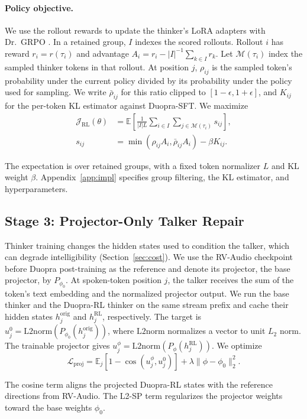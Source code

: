 \paragraph{Policy objective.}
We use the rollout rewards to update the thinker's LoRA adapters \citep{hu2022lora} with Dr.~GRPO \citep{liu2025drgrpo}. In a retained group, $I$ indexes the scored rollouts. Rollout $i$ has reward $r_i=r(\tau_i)$ and advantage $A_i=r_i-|I|^{-1}\sum_{k\in I}r_k$. Let $\mathcal{M}(\tau_i)$ index the sampled thinker tokens in that rollout. At position $j$, $\rho_{ij}$ is the sampled token's probability under the current policy divided by its probability under the policy used for sampling. We write $\bar\rho_{ij}$ for this ratio clipped to $[1-\epsilon,1+\epsilon]$, and $K_{ij}$ for the per-token KL estimator against Duopra-SFT. We maximize
\begin{equation}
\label{eq:grpo}
\begin{split}
\mathcal J_{\mathrm{RL}}(\theta) &= \mathbb E\!\left[
 \frac{1}{|I|L}\sum_{i\in I}\sum_{j\in\mathcal{M}(\tau_i)} s_{ij}\right],\\
 s_{ij}&=\min(\rho_{ij}A_i,\bar\rho_{ij}A_i)-\beta K_{ij}.
\end{split}
\end{equation}

The expectation is over retained groups, with a fixed token normalizer $L$ and KL weight $\beta$. Appendix~\ref{app:impl} specifies group filtering, the KL estimator, and hyperparameters.

\subsection{Stage 3: Projector-Only Talker Repair}
\label{sec:projector}

Thinker training changes the hidden states used to condition the talker, which can degrade intelligibility (Section~\ref{sec:cost}).
We use the RV-Audio checkpoint before Duopra post-training as the reference and denote its projector, the base projector, by $P_{\phi_0}$. At spoken-token position $j$, the talker receives the sum of the token's text embedding and the normalized projector output.
We run the base thinker and the Duopra-RL thinker on the same stream prefix and cache their hidden states $h_j^{\mathrm{orig}}$ and
$h_j^{\mathrm{RL}}$, respectively.
The target is $u_j^0=\mathrm{L2norm}(P_{\phi_0}(h_j^{\mathrm{orig}}))$,
where $\mathrm{L2norm}$ normalizes a vector to unit $L_2$ norm.
The trainable projector gives
$u_j^\phi=\mathrm{L2norm}(P_\phi(h_j^{\mathrm{RL}}))$.
We optimize
\begin{equation}
\label{eq:projector}
\mathcal L_{\mathrm{proj}}=
\mathbb{E}_{j}\!\left[1-\cos(u_j^\phi,u_j^0)\right]
+\lambda\lVert\phi-\phi_0\rVert_2^2 .
\end{equation}

The cosine term aligns the projected Duopra-RL states with the
reference directions from RV-Audio. The L2-SP term
\citep{li2018explicit} regularizes the projector weights toward
the base weights $\phi_0$.
